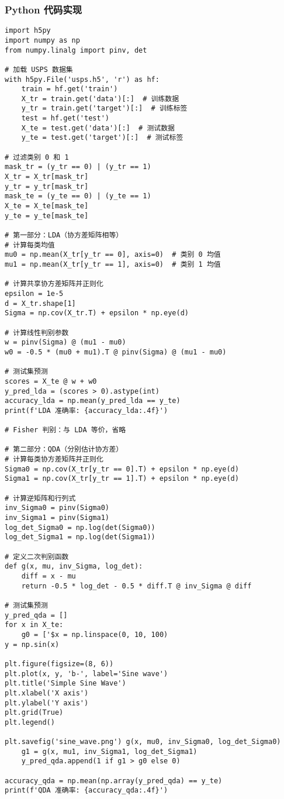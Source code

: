 \documentclass[UTF8]{report}
\theoremstyle{MyLineTheoremStyle} %
\theoremstyle{MyBlockTheoremStyle} %
\theoremstyle{MySubsubsectionStyle} %
\begin{document}
\subsubsection{Python 代码实现}
\begin{lstlisting}
import h5py
import numpy as np
from numpy.linalg import pinv, det

# 加载 USPS 数据集
with h5py.File('usps.h5', 'r') as hf:
    train = hf.get('train')
    X_tr = train.get('data')[:]  # 训练数据
    y_tr = train.get('target')[:]  # 训练标签
    test = hf.get('test')
    X_te = test.get('data')[:]  # 测试数据
    y_te = test.get('target')[:]  # 测试标签

# 过滤类别 0 和 1
mask_tr = (y_tr == 0) | (y_tr == 1)
X_tr = X_tr[mask_tr]
y_tr = y_tr[mask_tr]
mask_te = (y_te == 0) | (y_te == 1)
X_te = X_te[mask_te]
y_te = y_te[mask_te]

# 第一部分：LDA（协方差矩阵相等）
# 计算每类均值
mu0 = np.mean(X_tr[y_tr == 0], axis=0)  # 类别 0 均值
mu1 = np.mean(X_tr[y_tr == 1], axis=0)  # 类别 1 均值

# 计算共享协方差矩阵并正则化
epsilon = 1e-5
d = X_tr.shape[1]
Sigma = np.cov(X_tr.T) + epsilon * np.eye(d)

# 计算线性判别参数
w = pinv(Sigma) @ (mu1 - mu0)
w0 = -0.5 * (mu0 + mu1).T @ pinv(Sigma) @ (mu1 - mu0)

# 测试集预测
scores = X_te @ w + w0
y_pred_lda = (scores > 0).astype(int)
accuracy_lda = np.mean(y_pred_lda == y_te)
print(f'LDA 准确率: {accuracy_lda:.4f}')

# Fisher 判别：与 LDA 等价，省略

# 第二部分：QDA（分别估计协方差）
# 计算每类协方差矩阵并正则化
Sigma0 = np.cov(X_tr[y_tr == 0].T) + epsilon * np.eye(d)
Sigma1 = np.cov(X_tr[y_tr == 1].T) + epsilon * np.eye(d)

# 计算逆矩阵和行列式
inv_Sigma0 = pinv(Sigma0)
inv_Sigma1 = pinv(Sigma1)
log_det_Sigma0 = np.log(det(Sigma0))
log_det_Sigma1 = np.log(det(Sigma1))

# 定义二次判别函数
def g(x, mu, inv_Sigma, log_det):
    diff = x - mu
    return -0.5 * log_det - 0.5 * diff.T @ inv_Sigma @ diff

# 测试集预测
y_pred_qda = []
for x in X_te:
    g0 = ['$x = np.linspace(0, 10, 100)
y = np.sin(x)

plt.figure(figsize=(8, 6))
plt.plot(x, y, 'b-', label='Sine wave')
plt.title('Simple Sine Wave')
plt.xlabel('X axis')
plt.ylabel('Y axis')
plt.grid(True)
plt.legend()

plt.savefig('sine_wave.png') g(x, mu0, inv_Sigma0, log_det_Sigma0)
    g1 = g(x, mu1, inv_Sigma1, log_det_Sigma1)
    y_pred_qda.append(1 if g1 > g0 else 0)

accuracy_qda = np.mean(np.array(y_pred_qda) == y_te)
print(f'QDA 准确率: {accuracy_qda:.4f}')
\end{lstlisting}
\end{document}
